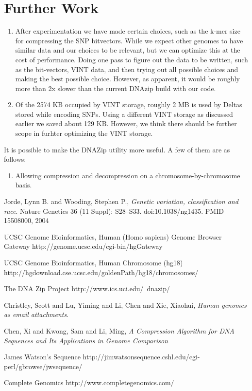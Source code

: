 \documentclass{article}
\begin{document}
\section {Further Work}

\begin{enumerate}
\item After experimentation we have made certain choices, such as the k-mer size
for compressing the SNP bitvectors. While we expect other genomes to have similar
data and our choices to be relevant, but we can optimize this at the cost of
performance. Doing one pass to figure out the data to be written, such as the 
bit-vectors, VINT data, and then trying out all possible choices and making the
best possible choice. However, as apparent, it would be roughly more than 2x slower
than the current DNAzip build with our code.

\item Of the 2574 KB occupied by VINT storage, roughly 2 MB is used by Deltas stored
while encoding SNPs. Using a different VINT storage as discussed earlier we saved about
129 KB. However, we think there should be further scope in furhter optimizing the
VINT storage. 

\end{enumerate}

It is possible to make the DNAZip utility more useful. A few of them are as follows:

\begin{enumerate}
\item Allowing compression and decompression on a chromosome-by-chromosome basis.
\end{enumerate}

\clearpage

\begin{thebibliography}{}

  Jorde, Lynn B. and Wooding, Stephen P.,
  \emph{Genetic variation, classification and race}.
  Nature Genetics 36 (11 Suppl): S28–S33. doi:10.1038/ng1435. PMID 15508000,
  2004

  UCSC Genome Bioinformatics, Human (Homo sapiens) Genome Browser Gateway
  http://genome.ucsc.edu/cgi-bin/hgGateway

  UCSC Genome Bioinformatics, Human Chromosome (hg18)
  http://hgdownload.cse.ucsc.edu/goldenPath/hg18/chromosomes/

  The DNA Zip Project
  http://www.ics.uci.edu/~dnazip/

  Christley, Scott and Lu, Yiming and Li, Chen and Xie, Xiaohui,
  \emph{Human genomes as email attachments}.

  Chen, Xi and Kwong, Sam and Li, Ming,
  \emph{A Compression Algorithm for DNA Sequences and Its Applications in Genome Comparison}
 
  James Watson's Sequence
  http://jimwatsonsequence.cshl.edu/cgi-perl/gbrowse/jwsequence/

  Complete Genomics
  http://www.completegenomics.com/ 
\end{thebibliography}
\end{document}

